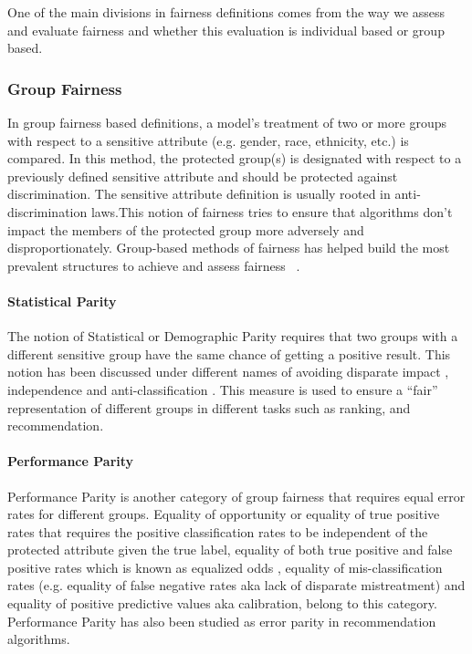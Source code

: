 One of the main divisions in fairness definitions comes from the way we assess and evaluate fairness and whether this evaluation is individual based or group based.

\subsubsection{Group Fairness}
In group fairness based definitions, a model’s treatment of two or more groups with respect to a sensitive attribute (e.g. gender, race, ethnicity, etc.) is compared. In this method, the protected group(s) is designated with respect to a previously defined sensitive attribute and should be protected against discrimination. The sensitive attribute definition is usually rooted in anti-discrimination laws\cite{barocas2016big}.This notion of fairness tries to ensure that algorithms don't impact the members of the protected group more adversely and disproportionately. Group-based methods of fairness has helped build the most prevalent structures to achieve and assess fairness ~\cite{zemel2013learning,kamishima2012fairness,kamiran2010discrimination,zhang2017anti}.

\paragraph{Statistical Parity}
The notion of Statistical or Demographic Parity requires that two groups with a different sensitive group have the same chance of getting a positive result. This notion has been discussed under different names of avoiding disparate impact \cite{Feldman2015}, independence \cite{barocas2018fairness} and anti-classification \cite{corbett2018measure}. This measure is used to ensure a ``fair'' representation of different groups in different tasks such as ranking\cite{singh2018fairness,zehlike2017fa,yang2017measuring}, and recommendation\cite{mehtora2018towards,ekstrand2018exploring}.
    
\paragraph{Performance Parity}
Performance Parity is another category of group fairness that requires equal error rates for different groups. Equality of opportunity or equality of true positive rates \cite{hardt2016equality} that requires the positive classification rates to be independent of the protected attribute given the true label, equality of both true positive and false positive rates which is known as equalized odds \cite{hardt2016equality}, equality of mis-classification rates (e.g. equality of false negative rates aka lack of disparate mistreatment\cite{zafar2017fairness}) and equality of positive predictive values aka calibration, belong to this category. 
    Performance Parity has also been studied as error parity in recommendation algorithms\cite{ekstrand2018all,yao_huang_fatml-2017}.

